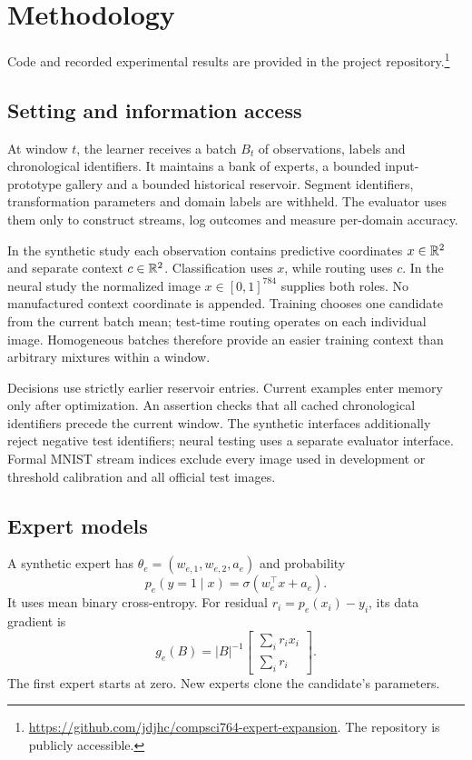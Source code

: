 \section{Methodology}
Code and recorded experimental results are provided in the project repository.\footnote{\url{https://github.com/jdjhc/compsci764-expert-expansion}. The repository is publicly accessible.}
\subsection{Setting and information access}
At window \(t\), the learner receives a batch \(B_t\) of observations, labels and chronological identifiers. It maintains a bank of experts, a bounded input-prototype gallery and a bounded historical reservoir. Segment identifiers, transformation parameters and domain labels are withheld. The evaluator uses them only to construct streams, log outcomes and measure per-domain accuracy.

In the synthetic study each observation contains predictive coordinates \(x\in\mathbb{R}^2\) and separate context \(c\in\mathbb{R}^2\). Classification uses \(x\), while routing uses \(c\). In the neural study the normalized image \(x\in[0,1]^{784}\) supplies both roles. No manufactured context coordinate is appended. Training chooses one candidate from the current batch mean; test-time routing operates on each individual image. Homogeneous batches therefore provide an easier training context than arbitrary mixtures within a window.

Decisions use strictly earlier reservoir entries. Current examples enter memory only after optimization. An assertion checks that all cached chronological identifiers precede the current window. The synthetic interfaces additionally reject negative test identifiers; neural testing uses a separate evaluator interface. Formal MNIST stream indices exclude every image used in development or threshold calibration and all official test images.

\subsection{Expert models}
A synthetic expert has \(\theta_e=(w_{e,1},w_{e,2},a_e)\) and probability
\begin{equation}
p_e(y=1\mid x)=\sigma(w_e^\top x+a_e).
\end{equation}
It uses mean binary cross-entropy. For residual \(r_i=p_e(x_i)-y_i\), its data gradient is
\begin{equation}
g_e(B)=|B|^{-1}\begin{bmatrix}\sum_i r_ix_i\\\sum_i r_i\end{bmatrix}.
\end{equation}
The first expert starts at zero. New experts clone the candidate's parameters.

